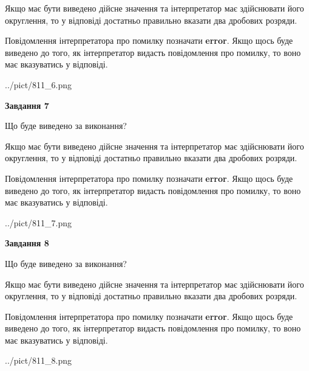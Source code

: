 \documentclass[12pt, ukrainian]{article}
\begin{document}
{\begin {Large}
Якщо має бути виведено дійсне значення та інтерпретатор має здійснювати його округлення, 
то у відповіді достатньо правильно вказати два дробових розряди.

Повідомлення інтерпретатора про помилку позначати \textbf{error}.
Якщо щось буде виведено до того, як інтерпретатор видасть повідомлення про помилку, 
то воно має вказуватись у відповіді. \par

\begin{center}
	{../pict/811_6.png}
\end{center}
\newpage

{\begin {center}\textbf{Завдання 7}\end {center}}\par
Що буде виведено за виконання? \par

Якщо має бути виведено дійсне значення та інтерпретатор має здійснювати його округлення, 
то у відповіді достатньо правильно вказати два дробових розряди.

Повідомлення інтерпретатора про помилку позначати \textbf{error}.
Якщо щось буде виведено до того, як інтерпретатор видасть повідомлення про помилку, 
то воно має вказуватись у відповіді. \par

\begin{center}
	{../pict/811_7.png}
\end{center}
\newpage

{\begin {center}\textbf{Завдання 8}\end {center}}\par
Що буде виведено за виконання? \par

Якщо має бути виведено дійсне значення та інтерпретатор має здійснювати його округлення, 
то у відповіді достатньо правильно вказати два дробових розряди.

Повідомлення інтерпретатора про помилку позначати \textbf{error}.
Якщо щось буде виведено до того, як інтерпретатор видасть повідомлення про помилку, 
то воно має вказуватись у відповіді. \par

\begin{center}
	{../pict/811_8.png}
\end{center}
\newpage


\end{Large}}
\end{document}

